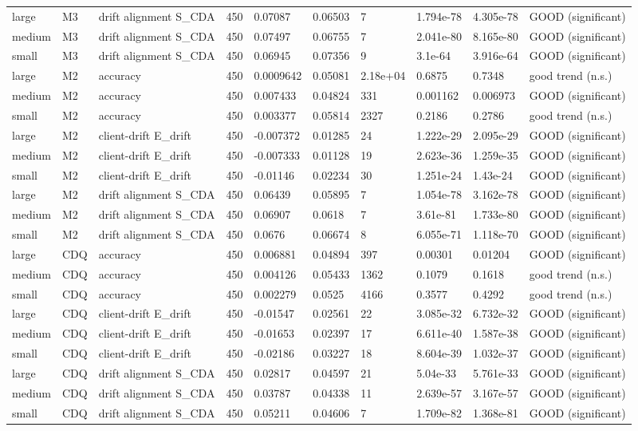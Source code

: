 \begin{table}[t]
\begin{tabular}{llllllllll}
large & M3 & drift alignment S\_CDA & 450 & 0.07087 & 0.06503 & 7 & 1.794e-78 & 4.305e-78 & GOOD (significant) \\
medium & M3 & drift alignment S\_CDA & 450 & 0.07497 & 0.06755 & 7 & 2.041e-80 & 8.165e-80 & GOOD (significant) \\
small & M3 & drift alignment S\_CDA & 450 & 0.06945 & 0.07356 & 9 & 3.1e-64 & 3.916e-64 & GOOD (significant) \\
large & M2 & accuracy & 450 & 0.0009642 & 0.05081 & 2.18e+04 & 0.6875 & 0.7348 & good trend (n.s.) \\
medium & M2 & accuracy & 450 & 0.007433 & 0.04824 & 331 & 0.001162 & 0.006973 & GOOD (significant) \\
small & M2 & accuracy & 450 & 0.003377 & 0.05814 & 2327 & 0.2186 & 0.2786 & good trend (n.s.) \\
large & M2 & client-drift E\_drift & 450 & -0.007372 & 0.01285 & 24 & 1.222e-29 & 2.095e-29 & GOOD (significant) \\
medium & M2 & client-drift E\_drift & 450 & -0.007333 & 0.01128 & 19 & 2.623e-36 & 1.259e-35 & GOOD (significant) \\
small & M2 & client-drift E\_drift & 450 & -0.01146 & 0.02234 & 30 & 1.251e-24 & 1.43e-24 & GOOD (significant) \\
large & M2 & drift alignment S\_CDA & 450 & 0.06439 & 0.05895 & 7 & 1.054e-78 & 3.162e-78 & GOOD (significant) \\
medium & M2 & drift alignment S\_CDA & 450 & 0.06907 & 0.0618 & 7 & 3.61e-81 & 1.733e-80 & GOOD (significant) \\
small & M2 & drift alignment S\_CDA & 450 & 0.0676 & 0.06674 & 8 & 6.055e-71 & 1.118e-70 & GOOD (significant) \\
large & CDQ & accuracy & 450 & 0.006881 & 0.04894 & 397 & 0.00301 & 0.01204 & GOOD (significant) \\
medium & CDQ & accuracy & 450 & 0.004126 & 0.05433 & 1362 & 0.1079 & 0.1618 & good trend (n.s.) \\
small & CDQ & accuracy & 450 & 0.002279 & 0.0525 & 4166 & 0.3577 & 0.4292 & good trend (n.s.) \\
large & CDQ & client-drift E\_drift & 450 & -0.01547 & 0.02561 & 22 & 3.085e-32 & 6.732e-32 & GOOD (significant) \\
medium & CDQ & client-drift E\_drift & 450 & -0.01653 & 0.02397 & 17 & 6.611e-40 & 1.587e-38 & GOOD (significant) \\
small & CDQ & client-drift E\_drift & 450 & -0.02186 & 0.03227 & 18 & 8.604e-39 & 1.032e-37 & GOOD (significant) \\
large & CDQ & drift alignment S\_CDA & 450 & 0.02817 & 0.04597 & 21 & 5.04e-33 & 5.761e-33 & GOOD (significant) \\
medium & CDQ & drift alignment S\_CDA & 450 & 0.03787 & 0.04338 & 11 & 2.639e-57 & 3.167e-57 & GOOD (significant) \\
small & CDQ & drift alignment S\_CDA & 450 & 0.05211 & 0.04606 & 7 & 1.709e-82 & 1.368e-81 & GOOD (significant) \\
\bottomrule
\end{tabular}
\end{table}